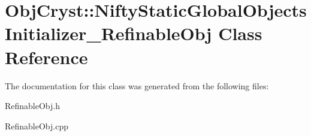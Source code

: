 \hypertarget{class_obj_cryst_1_1_nifty_static_global_objects_initializer___refinable_obj}{}\section{Obj\+Cryst\+::Nifty\+Static\+Global\+Objects\+Initializer\+\_\+\+Refinable\+Obj Class Reference}
\label{class_obj_cryst_1_1_nifty_static_global_objects_initializer___refinable_obj}


The documentation for this class was generated from the following files\+:\begin{DoxyCompactItemize}
\item 
Refinable\+Obj.\+h\item 
Refinable\+Obj.\+cpp\end{DoxyCompactItemize}
